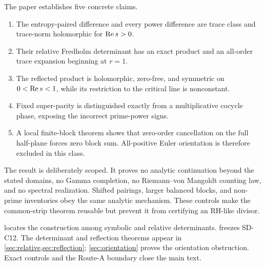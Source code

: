 The paper establishes five concrete claims.
\begin{enumerate}
 \item The entropy-paired difference and every power difference are trace
       class and trace-norm holomorphic for $\operatorname{Re} s>0$.
 \item Their relative Fredholm determinant has an exact product and an
       all-order trace expansion beginning at $r=1$.
 \item The reflected product is holomorphic, zero-free, and symmetric on
       $0<\operatorname{Re} s<1$, while its restriction to the critical line is
       nonconstant.
 \item Fixed super-parity is distinguished exactly from a multiplicative
       cocycle phase, exposing the incorrect prime-power signs.
 \item A local finite-block theorem shows that zero-order cancellation on the
       full half-plane forces zero block sum.  All-positive Euler orientation
       is therefore excluded in this class.
\end{enumerate}

The result is deliberately scoped.  It proves no analytic continuation beyond
the stated domains, no Gamma completion, no Riemann--von Mangoldt counting law,
and no spectral realization.  Shifted pairings, larger balanced blocks, and
non-prime inventories obey the same analytic mechanism.  These controls make
the common-strip theorem reusable but prevent it from certifying an RH-like
divisor.

 locates the construction among symbolic and relative
determinants.   freezes SD-C12.  The determinant and reflection
theorems appear in \cref{sec:relative,sec:reflection};
\cref{sec:orientation} proves the orientation obstruction.  Exact controls and
the Route-A boundary close the main text.
